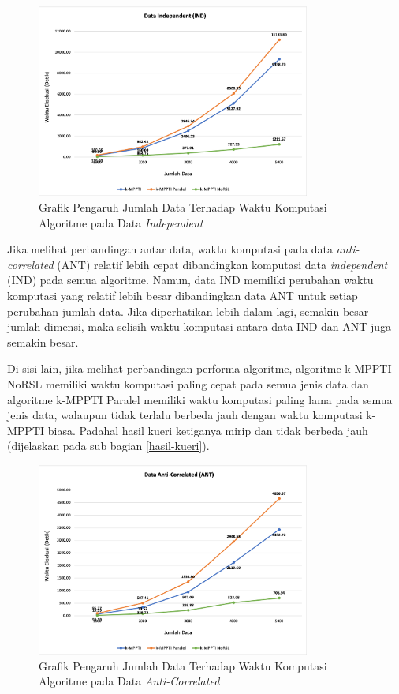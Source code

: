 \begin{figure}[H]
	\centering
	\includegraphics[width=9cm]{assets/img/bab5/grafik-ind-jml-time.png}
	\caption{Grafik Pengaruh Jumlah Data Terhadap Waktu Komputasi Algoritme pada Data \textit{Independent}}
	\label{fig:grafik-ind-jml-time}
\end{figure}

Jika melihat perbandingan antar data, waktu komputasi pada data \textit{anti-correlated} (ANT) relatif lebih cepat dibandingkan komputasi data \textit{independent} (IND) pada semua algoritme. Namun, data IND memiliki perubahan waktu komputasi yang relatif lebih besar dibandingkan data ANT untuk setiap perubahan jumlah data. Jika diperhatikan lebih dalam lagi, semakin besar jumlah dimensi, maka selisih waktu komputasi antara data IND dan ANT juga semakin besar.

Di sisi lain, jika melihat perbandingan performa algoritme, algoritme k-MPPTI NoRSL memiliki waktu komputasi paling cepat pada semua jenis data dan algoritme k-MPPTI Paralel memiliki waktu komputasi paling lama pada semua jenis data, walaupun tidak terlalu berbeda jauh dengan waktu komputasi k-MPPTI biasa. Padahal hasil kueri ketiganya mirip dan tidak berbeda jauh (dijelaskan pada sub bagian \ref{hasil-kueri}).

\begin{figure}[H]
	\centering
	\includegraphics[width=9cm]{assets/img/bab5/grafik-ant-jml-time.png}
	\caption{Grafik Pengaruh Jumlah Data Terhadap Waktu Komputasi Algoritme pada Data \textit{Anti-Correlated}}
	\label{fig:grafik-ant-jml-time}
\end{figure}

